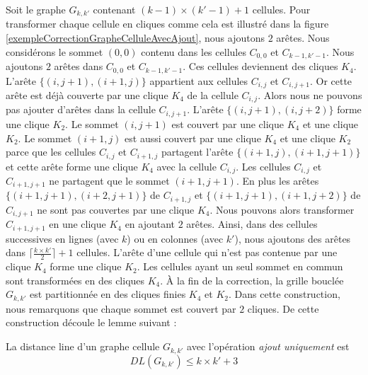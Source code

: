 Soit le graphe $G_{k,k'}$ contenant $(k -1) \times (k'-1) + 1$ cellules.
Pour transformer chaque cellule en cliques comme cela est illustr\'e dans la figure \ref{exempleCorrectionGrapheCelluleAvecAjout}, nous ajoutons $2$ ar\^etes.
Nous consid\'erons le sommet $(0,0)$ contenu dans les cellules $C_{0,0}$ et $C_{k-1,k'-1}$.
Nous ajoutons $2$ ar\^etes dans $C_{0,0}$ et $C_{k-1,k'-1}$. Ces cellules deviennent des cliques $K_4$. 
\newline
L'ar\^ete $\{(i,j+1),(i+1,j)\}$ appartient aux cellules  $C_{i,j}$ et  $C_{i,j+1}$.
Or cette ar\^ete est d\'ej\`a couverte par une clique $K_4$ de la cellule $C_{i,j}$.
Alors nous ne pouvons pas ajouter d'ar\^etes dans la cellule $C_{i,j+1}$.
 L'ar\^ete $\{(i,j+1),(i,j+2)\}$ forme une clique $K_2$.
 Le sommet $(i,j+1)$ est couvert par une clique $K_4$ et une clique $K_2$. 
Le sommet $(i+1,j)$ est aussi couvert par une clique $K_4$ et une clique $K_2$ parce que les cellules $C_{i,j}$ et  $C_{i+1,j}$ partagent l'ar\^ete $\{(i+1,j),(i+1,j+1)\}$  et cette ar\^ete forme une clique $K_4$ avec la cellule $C_{i,j}$.
Les cellules $C_{i,j}$ et  $C_{i+1,j+1}$ ne partagent que le sommet  $(i+1,j+1)$. En plus les ar\^etes  $\{(i+1,j+1),(i+2,j+1)\}$ de  $C_{i+1,j}$ et  $\{(i+1,j+1),(i+1,j+2)\}$ de $C_{i,j+1}$ ne sont pas couvertes par une clique $K_4$. Nous pouvons alors transformer $C_{i+1,j+1}$ en une clique $K_4$  en ajoutant $2$ ar\^etes.
\newline
Ainsi, dans des cellules successives en lignes (avec $k$) ou en colonnes (avec $k'$), nous ajoutons des ar\^etes dans $\lceil \frac{k \times k'}{2} \rceil  + 1$ cellules. 
L'ar\^ete  d'une cellule qui n'est pas contenue par une clique $K_4$ forme une clique $K_2$.
Les cellules ayant un seul sommet en commun sont transform\'ees en des cliques $K_4$. 
\newline
\`A la fin  de la correction, la grille boucl\'ee $G_{k,k'}$ est partitionn\'ee en des cliques finies $K_4$ et $K_2$.
Dans cette construction, nous remarquons que chaque sommet est couvert par $2$ cliques. De cette construction d\'ecoule le lemme suivant :

\begin{lemma}
La distance line d'un graphe cellule $G_{k,k'}$ avec l'op\'eration  {\em ajout uniquement} est 
\begin{equation}
DL(G_{k,k'}) \le k \times k' +3 
\end{equation}
\end{lemma}

